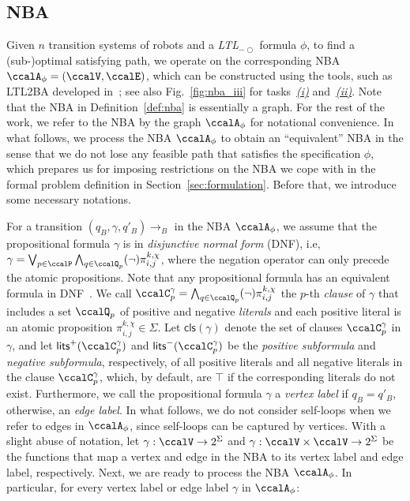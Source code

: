 \documentclass[Afour,sageh,times]{sagej}
\newcommand{\ltl}{ {\it LTL}$_{-\bigcirc}$ }
\newcommand{\autop}{\ccalA_{\phi}}
\renewcommand{\ap}[3]{\mathcal{\pi}_{{#1},{#2}}^{#3}}
\begin{document}
\subsection{NBA}\label{sec:nba}
Given $n$ transition systems of robots and a \ltl formula $\phi$, to find a (sub-)optimal satisfying path, we operate on the corresponding NBA $\autop = (\ccalV, \ccalE)$, which can  be constructed using the tools, such as LTL2BA developed in~\cite{gastin2001fast}; see also Fig.~\ref{fig:nba_iii} for tasks~\hyperref[task:i]{\it (i)} and~\hyperref[task:ii]{\it (ii)}. Note that the NBA in Definition~\ref{def:nba} is essentially a graph. For the rest of the work, we refer to the NBA by the graph $\autop$ for notational convenience. In what follows, we process the NBA $\autop$ to obtain an ``equivalent'' NBA in the sense that we do not lose any feasible path that satisfies the specification $\phi$, which prepares us for imposing restrictions on the NBA we cope with in the formal problem definition in Section~\ref{sec:formulation}. Before that, we introduce some necessary notations.

For a transition $(q_B, \gamma, q'_B)\to_B$ in the NBA $\autop$, we assume that the propositional formula $\gamma$ is  in {\it disjunctive normal form} (DNF), i.e,
$ \gamma = \bigvee_{p\in \ccalP} \bigwedge_{q\in \ccalQ_p} (\neg)\ap{i}{j}{k,\chi}$, where the negation operator can only precede the atomic propositions. Note that any propositional formula has an equivalent formula in DNF~\cite{baier2008principles}. We call  $\ccalC_p^{\gamma}=\bigwedge_{q\in \ccalQ_p}(\neg) \ap{i}{j}{k,\chi}$ the $p$-th {\it clause} of $\gamma$ that includes a set $\ccalQ_p$ of positive and negative {\it literals} and each positive literal is an atomic proposition $\ap{i}{j}{k,\chi}\in \Sigma$. Let $\mathsf{cls}(\gamma)$ denote the set of clauses $\ccalC_p^{\gamma}$ in $\gamma$, and let $\mathsf{lits}^+(\ccalC_p^{\gamma})$ and $\mathsf{lits}^-(\ccalC_p^{\gamma})$ be the {\it positive subformula} and {\it negative  subformula}, respectively,  of all positive literals and all negative literals in the clause $\ccalC_p^\gamma$, which, by default, are $\top$ if the corresponding literals do not exist. Furthermore, we call the propositional formula $\gamma$ a {\it vertex label} if $q_B=q'_B$, otherwise, an {\it edge label}. In what follows, we do not consider self-loops when we refer to edges in $\autop$, since self-loops can be captured by vertices.   With a slight abuse of notation, let {$\gamma: \ccalV \to  2^\Sigma $} and {$\gamma: \ccalV \times \ccalV \to 2^\Sigma$} be the functions that map a vertex and edge in the NBA to its vertex label and edge label, respectively. Next, we are ready to process the NBA $\autop$.  In particular, for every vertex label or edge label $\gamma$ in $\autop$:
\end{document}
